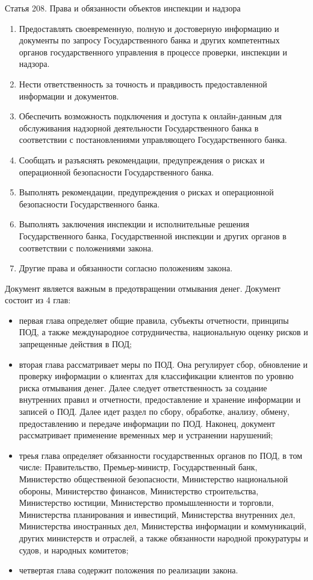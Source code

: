 \documentclass{article}
\begin{document}
Статья 208. Права и обязанности объектов инспекции и надзора

\begin{enumerate}
  \item Предоставлять своевременную, полную и достоверную информацию и документы по запросу Государственного банка и других компетентных органов государственного управления в процессе проверки, инспекции и надзора.
  \item Нести ответственность за точность и правдивость предоставленной информации и документов.
  \item Обеспечить возможность подключения и доступа к онлайн-данным для обслуживания надзорной деятельности Государственного банка в соответствии с постановлениями управляющего Государственного банка.
  \item Сообщать и разъяснять рекомендации, предупреждения о рисках и операционной безопасности Государственного банка.
  \item Выполнять рекомендации, предупреждения о рисках и операционной безопасности Государственного банка.
  \item Выполнять заключения инспекции и исполнительные решения Государственного банка, Государственной инспекции и других органов в соответствии с положениями закона.
  \item Другие права и обязанности согласно положениям закона.
\end{enumerate}

Документ \cite{law14} является важным в предотвращении отмывания денег. Документ состоит из 4 глав:

\begin{itemize}[label={--}]
  \item первая глава определяет общие правила, субъекты отчетности, принципы ПОД, а также международное сотрудничества, национальную оценку рисков и запрещенные действия в ПОД;
  \item вторая глава рассматривает меры по ПОД. Она регулирует сбор, обновление и проверку информации о клиентах для классификации клиентов по уровню риска отмывания денег. Далее следует ответственность за создание внутренних правил и отчетности, предоставление и хранение информации и записей о ПОД. Далее идет раздел по сбору, обработке, анализу, обмену, предоставлению и передаче информации по ПОД. Наконец, документ рассматривает применение временных мер и устранении нарушений;
  \item треья глава определяет обязанности государственных органов по ПОД, в том числе: Правительство, Премьер-министр, Государственный банк, Министерство общественной безопасности, Министерство национальной обороны, Министерство финансов, Министерство строительства, Министерство юстиции, Министерство промышленности и торговли, Министерства планирования и инвестиций, Министерства внутренних дел, Министерства иностранных дел, Министерства информации и коммуникаций, других министерств и отраслей, а также обязанности народной прокуратуры и судов, и народных комитетов;
  \item четвертая глава содержит положения по реализации закона.
\end{itemize}
\end{document}
